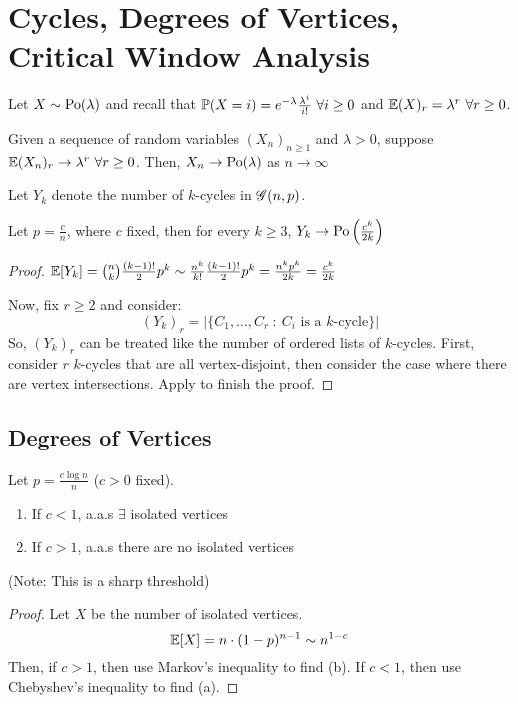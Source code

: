 \section{Cycles, Degrees of Vertices, Critical Window Analysis}

Let $X \sim \operatorname{\mathrm{Po}}(\lambda)$ and recall that $\operatorname{\mathbb{P}}(X = i) = e^{-\lambda}\frac{\lambda^i}{i!} \ \forall i \geq 0$ and $\operatorname{\mathbb{E}}(X)_r = \lambda^r \ \forall r \geq 0$.

\begin{theorem}\label{th:lec5-poisson}
    Given a sequence of random variables $(X_n)_{n \geq 1}$ and $\lambda > 0$, suppose $\E(X_n)_r \rightarrow \lambda^r \ \forall r \geq 0$. Then, $X_n \rightarrow \operatorname{\mathrm{Po}}(\lambda)$ as $n \rightarrow \infty$ 
\end{theorem}

Let $Y_k$ denote the number of $k$-cycles in $\operatorname{\mathscr{G}}(n, p)$.
\begin{theorem}
    Let $p = \frac{c}{n}$, where $c$ fixed, then for every $k \geq 3$, $Y_k \rightarrow \operatorname{\mathrm{Po}}\left(\frac{c^k}{2k}\right)$
\end{theorem}
\begin{proof}
    $\operatorname{\mathbb{E}}[Y_k] = \binom{n}{k}\frac{(k-1)!}{2}p^k \sim \frac{n^k}{k!}\frac{(k-1)!}{2}p^k = \frac{n^kp^k}{2k} = \frac{c^k}{2k}$
    
    Now, fix $r \geq 2$ and consider:
    \[
        (Y_k)_r = |\{C_1, \ldots, C_r \::\: C_i \text{ is a $k$-cycle} \}|
    \]
    So, $(Y_k)_r$ can be treated like the number of ordered lists of $k$-cycles.
    First, consider $r$ $k$-cycles that are all vertex-disjoint, then consider the case where there are vertex intersections.
    Apply  to finish the proof.
\end{proof}

\subsection{Degrees of Vertices}

\begin{theorem}
    Let $p = \frac{c\log n}{n}$ ($c > 0$ fixed).
    \begin{enumerate}[label=(\alph*)]
        \item If $c < 1$, a.a.s $\exists$ isolated vertices
        \item If $c > 1$, a.a.s there are no isolated vertices
    \end{enumerate}
    (Note: This is a sharp threshold)
\end{theorem}
\begin{proof}
    Let $X$ be the number of isolated vertices.
    \[
        \operatorname{\mathbb{E}}[X] = n\cdot(1 - p)^{n - 1} \sim n^{1-c}
    \]
    Then, if $c > 1$, then use Markov's inequality to find (b).
    If $c < 1$, then use Chebyshev's inequality to find (a).
\end{proof}

